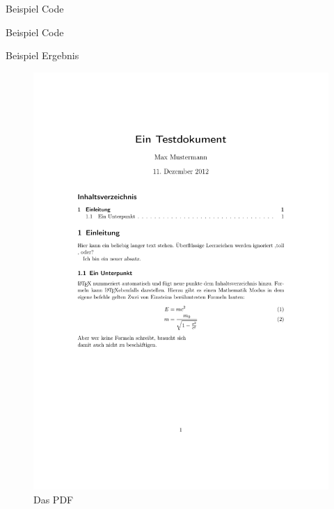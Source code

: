 \begin{frame}[fragile]{Beispiel Code}
	\begin{Code}
		
	\end{Code}

\end{frame}
\begin{frame}[fragile]{Beispiel Code}
	\begin{Code}
		
	\end{Code}

\end{frame}

\begin{frame}{Beispiel Ergebnis}
	\begin{figure}[tbph]
	\centering
	\includegraphics[height=\textheight]{./pictures/demonstration}
	\caption{Das PDF}
	\label{fig:demonstration}
	\end{figure}
\end{frame}



